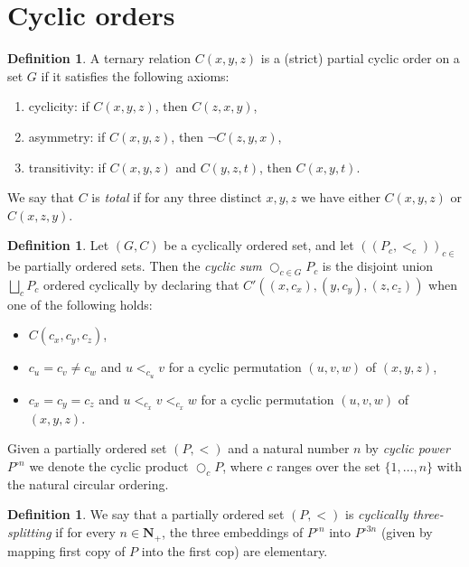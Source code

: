 \documentclass[final,a4paper,12pt]{amsart}
\date{\today}
\newcommand{\bN}{{\mathbf{N}}}
\theoremstyle{remark}
\theoremstyle{definition}
\newtheorem{dfn}[thm]{Definition}
\begin{document}
	
	\address{
		Instytut Matematyczny, Uniwersytet Wrocławski,
		pl. Grunwaldzki 2/4, 50-384 Wrocław, Poland
	}
	
	
	
	\author{Tomasz Rzepecki}
	
	\section{Cyclic orders}
	
	\begin{dfn}
		A ternary relation $C(x,y,z)$ is a (strict) partial cyclic order on a set $G$ if it satisfies the following axioms:
		\begin{enumerate}
			\item
			cyclicity: if $C(x,y,z)$, then $C(z,x,y)$,
			\item 
			asymmetry: if $C(x,y,z)$, then $\neg C(z,y,x)$,
			\item 
			transitivity: if $C(x,y,z)$ and $C(y,z,t)$, then $C(x,y,t)$.
		\end{enumerate}
		We say that $C$ is \emph{total} if for any three distinct $x,y,z$ we have either $C(x,y,z)$ or $C(x,z,y)$.
	\end{dfn}
	
	\begin{dfn}
		Let $(G,C)$ be a cyclically ordered set, and let $((P_c,<_c))_{c\in }$ be partially ordered sets. Then the \emph{cyclic sum} $\bigcirc_{c\in G} P_c$ is the disjoint union $\bigsqcup_c P_c$ ordered cyclically by declaring that $C'((x,c_x),(y,c_y),(z,c_z))$ when one of the following holds:
		\begin{itemize}
			\item 
			$C(c_x,c_y,c_z)$,
			\item 
			$c_u=c_v\neq c_w$ and $u<_{c_u} v$ for a cyclic permutation $(u,v,w)$ of $(x,y,z)$,
			\item 
			$c_x=c_y=c_z$ and $u<_{c_x} v<_{c_x}w$ for a cyclic permutation $(u,v,w)$ of $(x,y,z)$.
		\end{itemize}
		
		Given a partially ordered set $(P,<)$ and a natural number $n$ by \emph{cyclic power} $P^{\circ n}$ we denote the cyclic product $\bigcirc_{c} P$, where $c$ ranges over the set $\{1,\ldots, n \}$ with the natural circular ordering.
	\end{dfn}
	
	\begin{dfn}
		We say that a partially ordered set $(P,<)$ is \emph{cyclically three-splitting} if for every $n\in \bN_+$, the three embeddings of $P^{\circ n}$ into $P^{\circ 3n}$ (given by mapping first copy of $P$ into the first cop) are elementary.
	\end{dfn}
	
\end{document}
